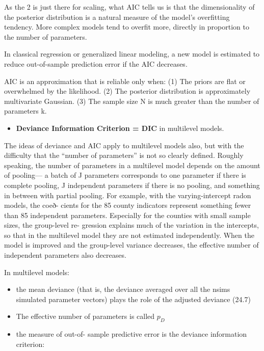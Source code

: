 \documentclass[
]{article}
\providecommand{\tightlist}{%
  \setlength{\itemsep}{0pt}\setlength{\parskip}{0pt}}
\begin{document}
As the 2 is just there for scaling, what AIC tells us is that the
dimensionality of the posterior distribution is a natural measure of the
model's overfitting tendency. More complex models tend to overfit more,
directly in proportion to the number of parameters.

In classical regression or generalized linear modeling, a new model is
estimated to reduce out-of-sample prediction error if the AIC decreases.

AIC is an approximation that is reliable only when: (1) The priors are
flat or overwhelmed by the likelihood. (2) The posterior distribution is
approximately multivariate Gaussian. (3) The sample size N is much
greater than the number of parameters k.

\begin{itemize}
\tightlist
\item
  \textbf{Deviance Information Criterion = DIC} in multilevel models.
\end{itemize}

The ideas of deviance and AIC apply to multilevel models also, but with
the difficulty that the ``number of parameters'' is not so clearly
defined. Roughly speaking, the number of parameters in a multilevel
model depends on the amount of pooling--- a batch of J parameters
corresponds to one parameter if there is complete pooling, J independent
parameters if there is no pooling, and something in between with partial
pooling. For example, with the varying-intercept radon models, the coeð-
cients for the 85 county indicators represent something fewer than 85
independent parameters. Especially for the counties with small sample
sizes, the group-level re- gression explains much of the variation in
the intercepts, so that in the multilevel model they are not estimated
independently. When the model is improved and the group-level variance
decreases, the effective number of independent parameters also
decreases.

In multilevel models:

\begin{itemize}
\item
  the mean deviance (that is, the deviance averaged over all the nsims
  simulated parameter vectors) plays the role of the adjusted deviance
  (24.7)
\item
  The effective number of parameters is called \(p_D\)
\item
  the measure of out-of- sample predictive error is the deviance
  information criterion:
\end{itemize}
\end{document}
